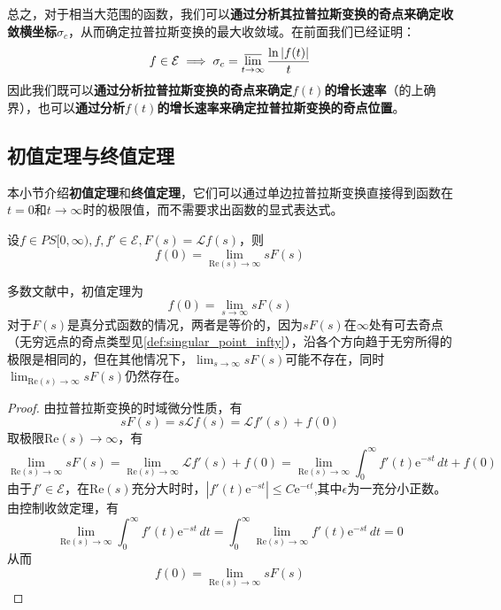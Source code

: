 总之，对于相当大范围的函数，我们可以\textbf{通过分析其拉普拉斯变换的奇点来确定收敛横坐标}$\sigma_c$，从而确定拉普拉斯变换的最大收敛域。在前面我们已经证明：$$f\in\mathcal{E}\implies \sigma_c=\varlimsup_{t\to\infty}\frac{\ln|f(t)|}{t}$$
因此我们既可以\textbf{通过分析拉普拉斯变换的奇点来确定$f(t)$的增长速率}（的上确界），也可以\textbf{通过分析$f(t)$的增长速率来确定拉普拉斯变换的奇点位置}。

\subsection{初值定理与终值定理}\label{sub:initial_and_final_value}
本小节介绍\textbf{初值定理}和\textbf{终值定理}，它们可以通过单边拉普拉斯变换直接得到函数在$t=0$和$t\to\infty$时的极限值，而不需要求出函数的显式表达式。
\begin{theorem}[初值定理]
    \label{thm:initial_value}
    设$f\in PS[0,\infty),f,f'\in\mathcal{E},F(s)=\mathcal{L} f(s)$，则
    \[f(0)=\lim_{\mathrm{Re}(s)\to\infty}sF(s)\]
\end{theorem}
\begin{remark}
    多数文献中，初值定理为
    \[f(0)=\lim_{s\to\infty}sF(s)\]
    对于$F(s)$是真分式函数的情况，两者是等价的，因为$sF(s)$在$\infty$处有可去奇点（无穷远点的奇点类型见\cref{def:singular_point_infty}），沿各个方向趋于无穷所得的极限是相同的，但在其他情况下，$\lim_{s\to\infty}sF(s)$可能不存在，同时$\lim_{\mathrm{Re}(s)\to\infty}sF(s)$仍然存在。
\end{remark}
\begin{proof}
    由拉普拉斯变换的时域微分性质，有
    \[sF(s)=s\mathcal{L} f(s)=\mathcal{L} f'(s)+f(0)\]
    取极限$\mathrm{Re}(s)\to\infty$，有
    \[\lim_{\mathrm{Re}(s)\to\infty}sF(s)=\lim_{\mathrm{Re}(s)\to\infty}\mathcal{L} f'(s)+f(0)=\lim_{\mathrm{Re}(s)\to\infty}\int_{0}^{\infty}f'(t)\mathrm{e}^{-st}\,dt+f(0)\]
    由于$f'\in\mathcal{E} $，在$\mathrm{Re}(s)$充分大时时，$\left|f'(t)\mathrm{e}^{-st}\right|\leq C \mathrm{e}^{-\epsilon t}$,其中$\epsilon$为一充分小正数。由控制收敛定理，有
    \[\lim_{\mathrm{Re}(s)\to\infty}\int_{0}^{\infty}f'(t)\mathrm{e}^{-st}\,dt=\int_{0}^{\infty}\lim_{\mathrm{Re}(s)\to\infty}f'(t)\mathrm{e}^{-st}\,dt=0\]
    从而\[f(0)=\lim_{\mathrm{Re}(s)\to\infty}sF(s)\]
\end{proof}

